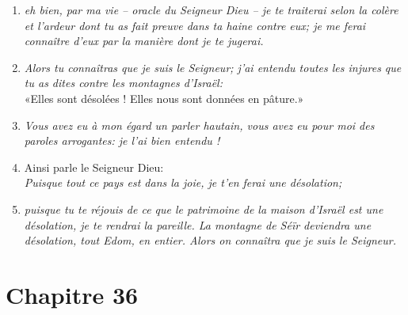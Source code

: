 \begin{enumerate}[leftmargin=\psleftmargin, labelsep = \pslabelsep, label={\arabic*}, font=\color{\pscolor}\small\textsuperscript, parsep=0em, itemsep=0em, topsep=0em ]
        «À moi les deux nations et les deux pays, \brk
        nous en prendrons possession», \\
        \textit{alors que le Seigneur est là,}
  \item {}\textit{eh bien, par ma vie – oracle du Seigneur Dieu – \brk
          je te traiterai selon la colère et l’ardeur \brk
          dont tu as fait preuve dans ta haine contre eux; \brk
          je me ferai connaître d’eux par la manière dont je te jugerai.}
  \item {}\textit{Alors tu connaîtras que je suis le Seigneur; \brk
          j’ai entendu toutes les injures que tu as dites contre les montagnes d’Israël:} \\
        «Elles sont désolées ! \brk
        Elles nous sont données en pâture.»
  \item {}\textit{Vous avez eu à mon égard un parler hautain, \brk
          vous avez eu pour moi des paroles arrogantes: \brk
          je l’ai bien entendu !} \parSpace
  \item {}Ainsi parle le Seigneur Dieu: \\
        \textit{Puisque tout ce pays est dans la joie, je t’en ferai une désolation;}
  \item {}\textit{puisque tu te réjouis de ce que le patrimoine de la maison d’Israël est une désolation, \brk
          je te rendrai la pareille. \brk
          La montagne de Séïr deviendra une désolation, tout Edom, en entier. \brk
          Alors on connaîtra que je suis le Seigneur.}
\end{enumerate}
\newpage

\section*{Chapitre 36}
